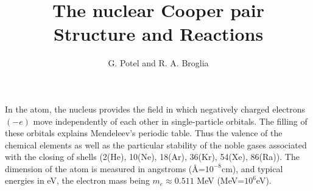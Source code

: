 \documentclass[a4paper,11pt]{book}
\title{The nuclear Cooper pair\\\large Structure and Reactions}
\author{G. Potel and R. A. Broglia}
\numberwithin{equation}{section}
\numberwithin{figure}{section}
\numberwithin{table}{section}
\begin{document}
	\maketitle
In the atom, the nucleus provides the  field in which negatively charged electrons $(-e)$ move independently of each other in single-particle orbitals. The filling of these orbitals explains Mendeleev's periodic table. Thus the valence of the chemical elements as well as the particular stability of the noble gases associated with the closing of shells (2(He), 10(Ne), 18(Ar), 36(Kr), 54(Xe), 86(Ra)). The dimension of the atom is measured in angstroms (\AA=$10^{-8}$cm), and typical energies in eV, the electron mass being $m_e\approx 0.511$ MeV (MeV=$10^6$eV).
\end{document}
